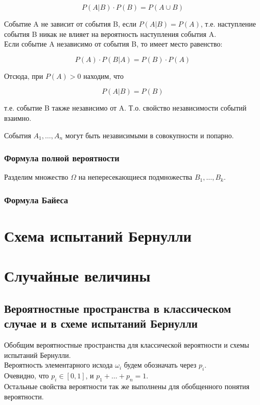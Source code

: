 \documentclass{article}
\theoremstyle{mydef}
\begin{document}
\begin{equation}
    P(A|B) \cdot P(B) = P(A \cup B)
\end{equation}

Событие A не зависит от события B, если $P(A|B) = P(A)$, т.е. наступление события B никак не влияет на вероятность наступления события A. \\
Если событие A независимо от события B, то имеет место равенство:

\begin{equation}
    P(A) \cdot P(B|A) = P(B) \cdot P(A)
\end{equation}

Отсюда, при $P(A)>0$ находим, что 

\begin{equation}
    P(A|B) = P(B)
\end{equation}

т.е. событие B также независимо от A. Т.о. свойство независимости событий взаимно.

События $A_1, \ldots, A_n$ могут быть независимыми в совокупности и попарно. 

\subsubsection{Формула полной вероятности}

Разделим множество $\Omega$ на непересекающиеся подмножества $B_1, \ldots, B_k$.

\subsubsection{Формула Байеса}

\section{Схема испытаний Бернулли}

\section{Случайные величины}

\subsection{Вероятностные пространства в классическом случае и в схеме испытаний Бернулли}

Обобщим вероятностные пространства для классической вероятности и схемы испытаний Бернулли. \\
Вероятность элементарного исхода $\omega_i$ будем обозначать через $p_i$. \\
Очевидно, что $p_i \in [0,1]$, и $p_1 + \ldots + p_n = 1$. \\
Остальные свойства вероятности так же выполнены для обобщенного понятия вероятности.
\end{document}
